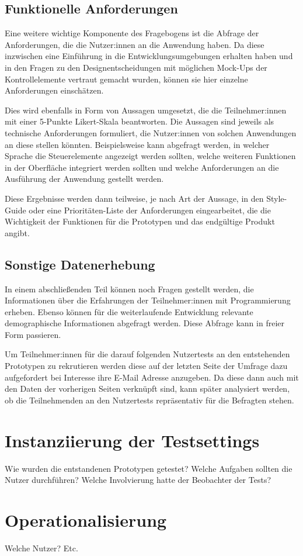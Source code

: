 \subsection{Funktionelle Anforderungen}
Eine weitere wichtige Komponente des Fragebogens ist die Abfrage der Anforderungen, die die Nutzer:innen an die Anwendung haben. Da diese inzwischen eine Einführung in die Entwicklungsumgebungen erhalten haben und in den Fragen zu den Designentscheidungen mit möglichen Mock-Ups der Kontrollelemente vertraut gemacht wurden, können sie hier einzelne Anforderungen einschätzen.

Dies wird ebenfalls in Form von Aussagen umgesetzt, die die Teilnehmer:innen mit einer 5-Punkte Likert-Skala beantworten. Die Aussagen sind jeweils als technische Anforderungen formuliert, die Nutzer:innen von solchen Anwendungen an diese stellen könnten. Beispielsweise kann abgefragt werden, in welcher Sprache die Steuerelemente angezeigt werden sollten, welche weiteren Funktionen in der Oberfläche integriert werden sollten und welche Anforderungen an die Ausführung der Anwendung gestellt werden.

Diese Ergebnisse werden dann teilweise, je nach Art der Aussage, in den Style-Guide oder eine Prioritäten-Liste der Anforderungen eingearbeitet, die die Wichtigkeit der Funktionen für die Prototypen und das endgültige Produkt angibt.

\subsection{Sonstige Datenerhebung}
In einem abschließenden Teil können noch Fragen gestellt werden, die Informationen über die Erfahrungen der Teilnehmer:innen mit Programmierung erheben. Ebenso können für die weiterlaufende Entwicklung relevante demographische Informationen abgefragt werden. Diese Abfrage kann in freier Form passieren.

Um Teilnehmer:innen für die darauf folgenden Nutzertests an den entstehenden Prototypen zu rekrutieren werden diese auf der letzten Seite der Umfrage dazu aufgefordert bei Interesse ihre E-Mail Adresse anzugeben. Da diese dann auch mit den Daten der vorherigen Seiten verknüpft sind, kann später analysiert werden, ob die Teilnehmenden an den Nutzertests repräsentativ für die Befragten stehen.

\section{Instanziierung der Testsettings} %
Wie wurden die entstandenen Prototypen getestet? Welche Aufgaben sollten die Nutzer durchführen? Welche Involvierung hatte der Beobachter der Tests?

\section{Operationalisierung}
Welche Nutzer? Etc.